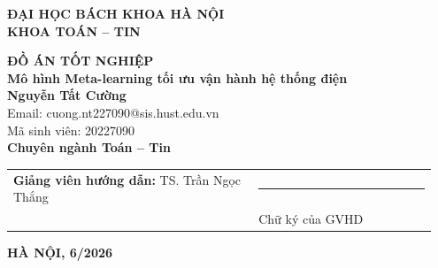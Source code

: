 \documentclass[12pt, a4paper]{report}
\begin{document}
\begin{titlepage}
  \thispagestyle{empty}
  \centering

  {\fontsize{14}{17}\selectfont\bfseries ĐẠI HỌC BÁCH KHOA HÀ NỘI}\\[4pt]
  {\fontsize{14}{17}\selectfont\bfseries KHOA TOÁN -- TIN}\\[4pt]


  \vspace{80pt}

  {\fontsize{20}{25}\selectfont\bfseries
    ĐỒ ÁN TỐT NGHIỆP}\\[20pt]

  {\fontsize{14}{18}\selectfont\bfseries
    Mô hình Meta-learning tối ưu vận hành hệ thống điện}\\[16pt]

  {\fontsize{14}{18}\selectfont\bfseries Nguyễn Tất Cường}\\[4pt]
  {\fontsize{12}{16}\selectfont Email: cuong.nt227090@sis.hust.edu.vn}\\[4pt]
  {\fontsize{12}{16}\selectfont Mã sinh viên: 20227090}\\[4pt]
  {\fontsize{12}{16}\selectfont\bfseries
    Chuyên ngành Toán -- Tin}\\[30pt]

  \noindent
  \begin{tabular}{@{} p{0.55\linewidth} >{\centering\arraybackslash}p{0.40\linewidth} @{}}
    \textbf{Giảng viên hướng dẫn:} \quad TS. Trần Ngọc Thắng
    & \rule{5cm}{0.4pt} \\[-4pt]
    & {\small Chữ ký của GVHD}
  \end{tabular}

  \vfill

  {\fontsize{14}{17}\selectfont\bfseries HÀ NỘI, 6/2026}
\end{titlepage}
\end{document}
